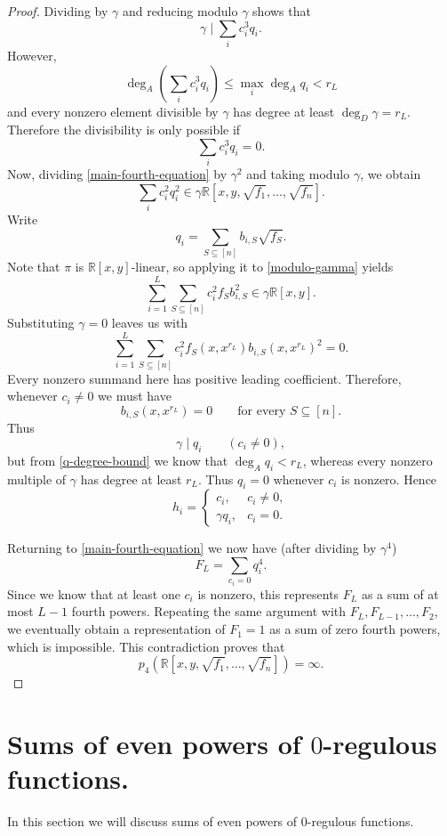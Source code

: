 \documentclass[12pt,reqno]{amsart}   	%
\theoremstyle{remark}
\newcommand{\R}{\mathbb{R}}
\newcommand{\brac}[1]{\left ( #1 \right )}
\begin{document}
\begin{proof}
    Dividing by $\gamma$ and reducing modulo $\gamma$ shows that
    \[
            \gamma\mid \sum_i c_i^3q_i.
    \]
    However,
    \[
    \deg_A\brac{ \sum_i c_i^3q_i } \leq \max_i\deg_A q_i<r_L
    \]
    and every nonzero element divisible by $\gamma$ has degree at least $\deg_D\gamma = r_L$. Therefore the divisibility is only possible if
    \[
    \sum_i c_i^3 q_i = 0.
    \]
    Now, dividing \eqref{main-fourth-equation} by $\gamma^2$ and taking modulo $\gamma$, we obtain
    \begin{equation}
    \sum_i c_i^2q_i^2\in\gamma \R[x,y,\sqrt{f_1},\ldots,\sqrt{f_n}].
        \label{modulo-gamma}
    \end{equation}
    Write
    \[
    q_i=\sum_{S\subseteq[n]}b_{i,S}\sqrt{f_S}.
    \]
    Note that $\pi$ is $\R[x,y]$-linear, so applying it to \eqref{modulo-gamma} yields
    \[
    \sum_{i=1}^L\sum_{S\subseteq[n]} c_i^2 f_S b_{i,S}^2 \in \gamma\mathbb R[x,y].
    \]
    Substituting $\gamma=0$ leaves us with
    \[
    \sum_{i=1}^L\sum_{S\subseteq[n]} c_i^2 f_S(x,x^{r_L}) b_{i,S}(x,x^{r_L})^2 = 0.
    \]
    Every nonzero summand here has positive leading coefficient. Therefore, whenever $c_i\neq 0$ we must have
    \[
    b_{i,S}(x,x^{r_L})=0 \qquad\text{for every }S\subseteq[n].
    \]
    Thus
    \[
    \gamma\mid q_i
    \qquad(c_i\neq0),
    \]
    but from \eqref{q-degree-bound} we know that $\deg_A q_i<r_L$, whereas every nonzero multiple of $\gamma$ has degree at least $r_L$. Thus $q_i=0$ whenever $c_i$ is nonzero. Hence
    \[
    h_i=
    \begin{cases}
    c_i, & c_i\neq0,\\
    \gamma q_i, & c_i=0.
    \end{cases}
    \]

    Returning to \eqref{main-fourth-equation} we now have (after dividing by $\gamma^4$)
    \[
        F_L=\sum_{c_i=0}q_i^4.
    \]
    Since we know that at least one $c_i$ is nonzero, this represents $F_L$ as a sum of at most $L-1$ fourth powers. Repeating the same argument with $F_L,F_{L-1},\ldots,F_2$, we eventually obtain a representation of $F_1=1$ as a sum of zero fourth powers, which is impossible. This contradiction proves that
    \[
    p_4\brac{\R[x,y,\sqrt{f_1},\ldots,\sqrt{f_n}]}=\infty.
    \]


\end{proof}







\section{Sums of even powers of $0$-regulous functions.}
In this section we will discuss sums of even powers of 0-regulous functions. 
\end{document}
